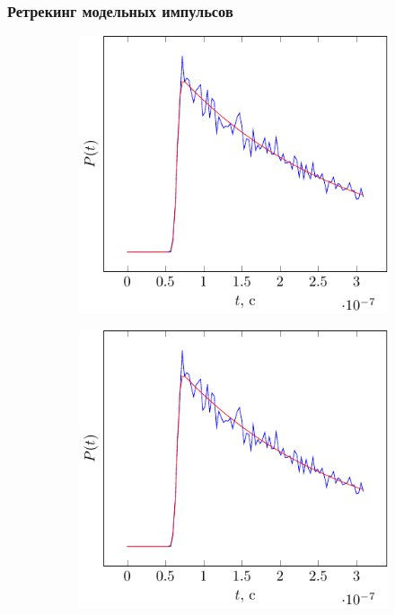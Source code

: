 \documentclass[10pt,pdf,hyperref={unicode}, dvipsnames]{beamer}
\begin{document}
\begin{frame}
\frametitle{Ретрекинг модельных импульсов}
\vskip -3pt
\begin{figure}
    \centering
    \begin{subfigure}{0.42\linewidth}
        \centering
        \includegraphics[width=1\linewidth,page=1]{fig/retracking/model}
    \end{subfigure}
    \hfill
    \begin{subfigure}{0.42\linewidth}
        \centering
        \includegraphics[width=1\linewidth,page=2]{fig/retracking/model}

\end{subfigure}
\end{figure}
\end{frame}
\end{document}
